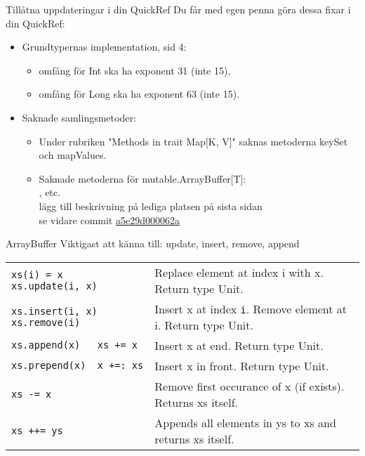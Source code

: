 \begin{Slide}{Tillåtna uppdateringar i din QuickRef}
Du får med egen penna göra dessa fixar i din QuickRef:
\begin{itemize}
\item Grundtypernas implementation, sid 4: 
\begin{itemize}

\item omfång för Int ska ha exponent 31 (inte 15), 
\item omfång för Long ska ha exponent 63 (inte 15).
\end{itemize}

\item Saknade samlingsmetoder: 
\begin{itemize}
\item Under rubriken "Methods in trait Map[K, V]" saknas metoderna keySet och mapValues. 
\item Saknade metoderna för mutable.ArrayBuffer[T]: \\     , etc. \\ lägg till beskrivning på lediga platsen på sista sidan \\ se vidare commit \href{}{a5e29d000062a}
\end{itemize}
\end{itemize}
\end{Slide}


\begin{Slide}{ArrayBuffer}
Viktigast att känna till: update, insert, remove, append
{\SlideFontTiny

\vspace{2.5em}\begin{tabular}{@{}p{4.2cm}  p{6.5cm}}
\texttt{xs(i) = x \newline xs.update(i, x)} & Replace element at index i with x. \newline Return type Unit.\\   \cline{1-2}

\texttt{xs.insert(i, x)\newline xs.remove(i)} & Insert x at index \texttt{i}. Remove element at i. \newline Return type Unit.\\   \cline{1-2}

\texttt{xs.append(x)~~~xs~+=~x} & Insert x at end.  Return type Unit.\\   \cline{1-2}

\texttt{xs.prepend(x)~~x~+=:~xs} & Insert x in front.  Return type Unit.\\   \cline{1-2}

\texttt{xs -= x} & Remove first occurance of x (if exists). \newline Returns xs itself. \\\cline{1-2}

\texttt{xs ++= ys} & Appends all elements in ys to xs and returns xs itself. \\

\end{tabular}
}
\end{Slide}



